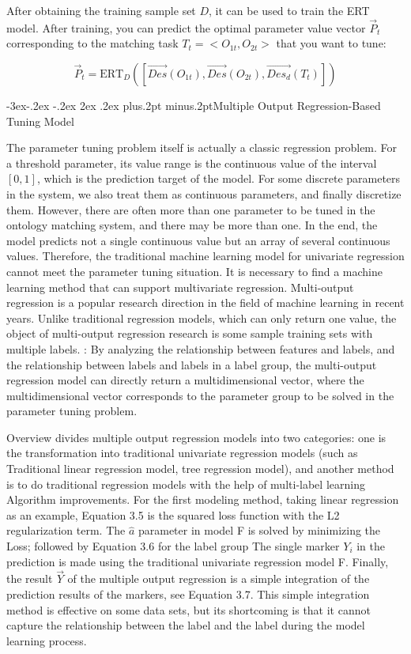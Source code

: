 \documentclass[twoside]{article}
\makeatletter
\def\subsection{\@startsection{subsection}{2}{\z@}%
 {-3ex\@plus -.2ex \@minus -.2ex}%
 {2ex \@plus.2ex}%
{\normalfont\normalsize\protect\baselineskip=12.5pt plus.2pt minus.2pt\bfseries}}
\makeatother
\begin{document}
\begin{multicols}{2}
After obtaining the training sample set $D$, it can be used to train the ERT model. 
After training, you can predict the optimal parameter value vector $\vec{P}_t$ corresponding to the matching task $T_t=<O_{1t},O_{2t}>$ that you want to tune:

\begin{equation}
\vec{P}_t = \text{ERT}_D([\vec{Des}(O_{1t}), \vec{Des}(O_{2t}), \vec{Des_d}(T_t)])
\end{equation}

\subsection{Multiple Output Regression-Based Tuning Model}

The parameter tuning problem itself is actually a classic regression problem. 
For a threshold parameter, its value range is the continuous value of the interval $[0,1]$, which is the prediction target of the model. 
For some discrete parameters in the system, we also treat them as continuous parameters, and finally discretize them. 
However, there are often more than one parameter to be tuned in the ontology matching system, and there may be more than one. In the end, the model predicts not a single continuous value but an array of several continuous values. 
Therefore, the traditional machine learning model for univariate regression cannot meet the parameter tuning situation. It is necessary to find a machine learning method that can support multivariate regression. 
Multi-output regression \cite{tyz74} is a popular research direction in the field of machine learning in recent years. Unlike traditional regression models, which can only return one value, the object of multi-output regression research is some sample training sets with multiple labels. : By analyzing the relationship between features and labels, and the relationship between labels and labels in a label group, the multi-output regression model can directly return a multidimensional vector, where the multidimensional vector corresponds to the parameter group to be solved in the parameter tuning problem.

Overview \cite{tyz74} divides multiple output regression models into two categories: one is the transformation into traditional univariate regression models (such as
Traditional linear regression model, tree regression model), and another method is to do traditional regression models with the help of multi-label learning
Algorithm improvements. 
For the first modeling method, taking linear regression as an example, Equation 3.5 is the squared loss function with the L2 regularization term. The $\hat{a}$ parameter in model F is solved by minimizing the Loss; followed by Equation 3.6 for the label group The single marker $Y_{i}$ in the prediction is made using the traditional univariate regression model F. Finally, the result $\vec{Y}$ of the multiple output regression is a simple integration of the prediction results of the markers, see Equation 3.7. 
This simple integration method is effective on some data sets, but its shortcoming is that it cannot capture the relationship between the label and the label during the model learning process.


\end{multicols}
\end{document}
